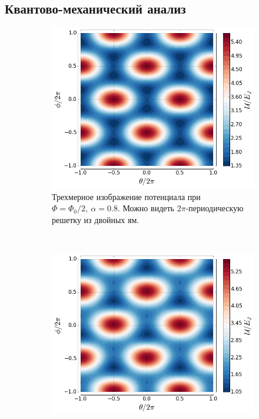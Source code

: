 \documentclass[12pt]{article}
\numberwithin{equation}{section}
\begin{document}
\subsection{Квантово-механический анализ}

\begin{figure}[!p]
\begingroup
\captionsetup[subfigure]{width=0.95\textwidth}
\centering
\begin{subfigure}[t]{0.49\linewidth}
\centering
\includegraphics[height = .8\textwidth]{Pictures/qubit_potential}
\caption{Трехмерное изображение потенциала при $\Phi = \Phi_0/2,\ \alpha=0.8$. Можно видеть $2\pi$-периодическую решетку из двойных ям.}
\label{fig:U3d}
\end{subfigure}~
\begin{subfigure}[t]{0.49\linewidth}
\centering
\includegraphics[height = .8\textwidth]{Pictures/qubit_potential2}

\end{subfigure}
\end{figure}
\end{document}
